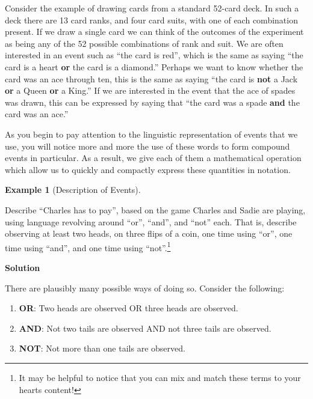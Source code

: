 \documentclass[
  letterpaper,
  DIV=11,
  numbers=noendperiod]{scrreprt}
\providecommand{\tightlist}{%
  \setlength{\itemsep}{0pt}\setlength{\parskip}{0pt}}\usepackage{longtable,booktabs,array}
\theoremstyle{definition}
\theoremstyle{definition}
\newtheorem{example}{Example}[chapter]
\theoremstyle{definition}
\theoremstyle{remark}
\begin{document}
Consider the example of drawing cards from a standard 52-card deck. In
such a deck there are 13 card ranks, and four card suits, with one of
each combination present. If we draw a single card we can think of the
outcomes of the experiment as being any of the 52 possible combinations
of rank and suit. We are often interested in an event such as ``the card
is red'', which is the same as saying ``the card is a heart \textbf{or}
the card is a diamond.'' Perhaps we want to know whether the card was an
ace through ten, this is the same as saying ``the card is \textbf{not} a
Jack \textbf{or} a Queen \textbf{or} a King.'' If we are interested in
the event that the ace of spades was drawn, this can be expressed by
saying that ``the card was a spade \textbf{and} the card was an ace.''

As you begin to pay attention to the linguistic representation of events
that we use, you will notice more and more the use of these words to
form compound events in particular. As a result, we give each of them a
mathematical operation which allow us to quickly and compactly express
these quantities in notation.

\begin{example}[Description of
Events]\protect\hypertarget{exm-linguistic-description}{}\label{exm-linguistic-description}

Describe ``Charles has to pay'', based on the game Charles and Sadie are
playing, using language revolving around ``or'', ``and'', and ``not''
each. That is, describe observing at least two heads, on three flips of
a coin, one time using ``or'', one time using ``and'', and one time
using ``not''.\footnote{It may be helpful to notice that you can mix and
  match these terms to your hearts content!}

\begin{tcolorbox}[enhanced jigsaw, colback=white, colframe=quarto-callout-color-frame, arc=.35mm, leftrule=.75mm, rightrule=.15mm, opacityback=0, breakable, bottomrule=.15mm, left=2mm, toprule=.15mm]

\vspace{-3mm}\textbf{Solution}\vspace{3mm}

There are plausibly many possible ways of doing so. Consider the
following:

\begin{enumerate}
\def\labelenumi{\arabic{enumi}.}
\tightlist
\item
  \textbf{OR}: Two heads are observed OR three heads are observed.
\item
  \textbf{AND}: Not two tails are observed AND not three tails are
  observed.
\item
  \textbf{NOT}: Not more than one tails are observed.
\end{enumerate}

\end{tcolorbox}

\end{example}
\end{document}
